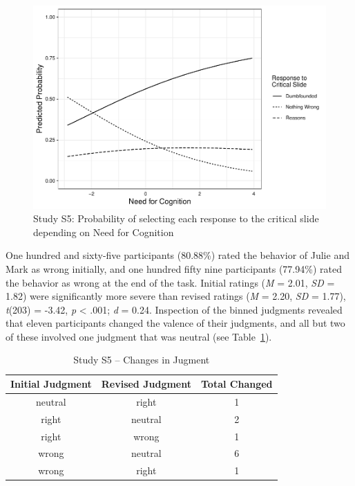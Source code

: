 \documentclass[
  man,floatsintext]{apa6}
\begin{document}
\begin{figure}[!h]
\includegraphics{Supplementary_files/figure-latex/ggplotlogit5-1} \caption{Study S5: Probability of selecting each response to the critical slide depending on Need for Cognition}\label{fig:ggplotlogit5}
\end{figure}

One hundred and sixty-five participants (80.88\%) rated the behavior of Julie and Mark as wrong initially, and one hundred fifty nine participants (77.94\%) rated the behavior as wrong at the end of the task. Initial ratings (\emph{M} = 2.01, \emph{SD} = 1.82) were significantly more severe than revised ratings (\emph{M} = 2.20, \emph{SD} = 1.77), \emph{t}(203) = -3.42, \emph{p} \textless{} .001; \emph{d} = 0.24. Inspection of the binned judgments revealed that eleven participants changed the valence of their judgments, and all but two of these involved one judgment that was neutral (see Table~\ref{tab:tabS5change}).

\begin{table}[tbp]

\begin{center}
\begin{threeparttable}

\caption{\label{tab:tabS5change}Study S5 – Changes in Jugment}

\begin{tabular}{ccc}
\toprule
Initial Judgment & \multicolumn{1}{c}{Revised Judgment} & \multicolumn{1}{c}{Total Changed}\\
\midrule
neutral & right & 1\\
right & neutral & 2\\
right & wrong & 1\\
wrong & neutral & 6\\
wrong & right & 1\\
\bottomrule
\end{tabular}

\end{threeparttable}
\end{center}

\end{table}
\end{document}
